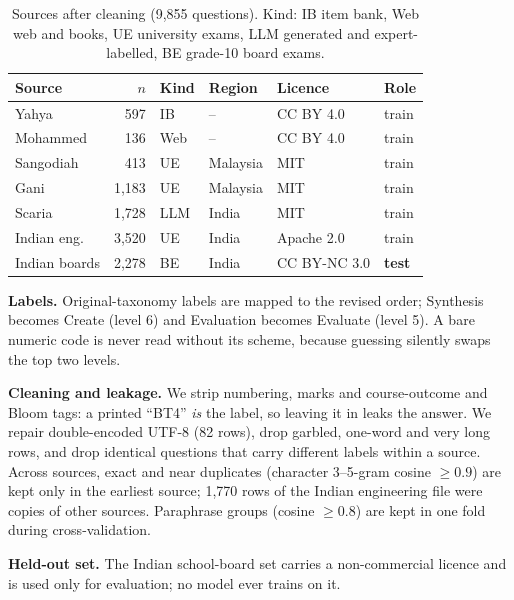 \documentclass[conference]{IEEEtran}
\begin{document}
\begin{table}[t]
\caption{Sources after cleaning (9,855 questions). Kind: IB item bank, Web web and books,
UE university exams, LLM generated and expert-labelled, BE grade-10 board exams.}
\label{tab:data}
\centering\footnotesize
\setlength{\tabcolsep}{2.6pt}
\begin{tabular}{@{}lrllll@{}}
\toprule
Source & $n$ & Kind & Region & Licence & Role \\
\midrule
Yahya \cite{yahya2012} & 597 & IB & -- & CC BY 4.0 & train \\
Mohammed \cite{mohammed2020} & 136 & Web & -- & CC BY 4.0 & train \\
Sangodiah \cite{sangodiah2017} & 413 & UE & Malaysia & MIT & train \\
Gani \cite{gani2023} & 1,183 & UE & Malaysia & MIT & train \\
Scaria \cite{scaria2024} & 1,728 & LLM & India & MIT & train \\
Indian eng. \cite{devane} & 3,520 & UE & India & Apache 2.0 & train \\
Indian boards \cite{ks2023} & 2,278 & BE & India & CC BY-NC 3.0 & \textbf{test} \\
\bottomrule
\end{tabular}
\end{table}

\textbf{Labels.} Original-taxonomy labels are mapped to the revised order; Synthesis becomes
Create (level 6) and Evaluation becomes Evaluate (level 5). A bare numeric code is never read
without its scheme, because guessing silently swaps the top two levels.

\textbf{Cleaning and leakage.} We strip numbering, marks and course-outcome and Bloom tags: a
printed ``BT4'' \emph{is} the label, so leaving it in leaks the answer. We repair double-encoded
UTF-8 (82 rows), drop garbled, one-word and very long rows, and drop identical questions that
carry different labels within a source. Across sources, exact and near duplicates (character
3--5-gram cosine $\ge 0.9$) are kept only in the earliest source; 1,770 rows of the Indian
engineering file were copies of other sources. Paraphrase groups (cosine $\ge 0.8$) are kept in
one fold during cross-validation.

\textbf{Held-out set.} The Indian school-board set \cite{ks2023} carries a non-commercial licence
and is used only for evaluation; no model ever trains on it.

\end{document}
